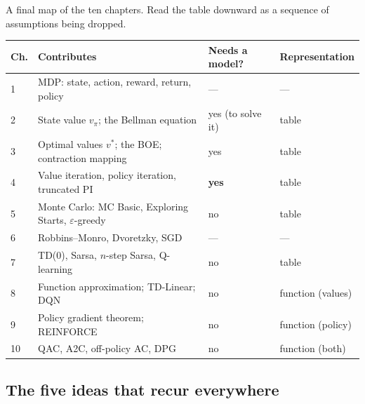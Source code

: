 \documentclass[11pt, letterpaper]{article}
\theoremstyle{runin}
\theoremstyle{runinplain}
\theoremstyle{remark}
\begin{document}
A final map of the ten chapters. Read the table downward as a sequence of
assumptions being dropped.

\begin{center}
\small
\begin{tabular}{@{}llll@{}}
\toprule
Ch. & Contributes & Needs a model? & Representation \\
\midrule
1 & MDP: state, action, reward, return, policy & --- & --- \\
2 & State value $v_\pi$; the Bellman equation & yes (to solve it) & table \\
3 & Optimal values $v^*$; the BOE; contraction mapping & yes & table \\
4 & Value iteration, policy iteration, truncated PI & \textbf{yes} & table \\
5 & Monte Carlo: MC Basic, Exploring Starts, $\varepsilon$-greedy & no & table \\
6 & Robbins--Monro, Dvoretzky, SGD & --- & --- \\
7 & TD(0), Sarsa, $n$-step Sarsa, Q-learning & no & table \\
8 & Function approximation; TD-Linear; DQN & no & function (values) \\
9 & Policy gradient theorem; REINFORCE & no & function (policy) \\
10 & QAC, A2C, off-policy AC, DPG & no & function (both) \\
\bottomrule
\end{tabular}
\end{center}

\subsection*{The five ideas that recur everywhere}
\end{document}
